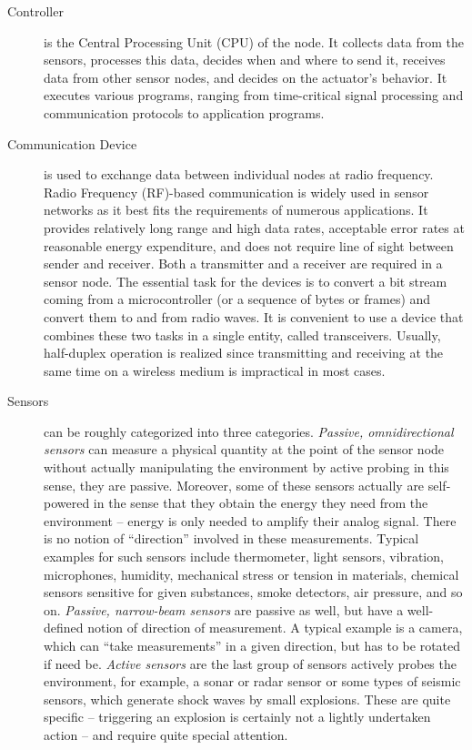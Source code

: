 	\begin{description}
	\item[Controller] is the Central Processing Unit (CPU) of the node.
		It collects data from the sensors, processes this data, decides when and where to send it, receives data from other sensor nodes, and decides on the actuator’s behavior.
		It executes various programs, ranging from time-critical signal processing and communication protocols to application programs.
	
	\item[Communication Device] is used to exchange data between individual nodes at radio frequency.
		Radio Frequency (RF)-based communication is widely used in sensor networks as it best fits the requirements of numerous applications.
		It provides relatively long range and high data rates, acceptable error rates at reasonable energy expenditure, and does not require line of sight between sender and receiver.
		Both a transmitter and a receiver are required in a sensor node. 
		The essential task for the devices is to convert a bit stream coming from a microcontroller (or a sequence of bytes or frames) and convert them to and from radio waves. 
		It is convenient to use a device that combines these two tasks in a single entity, called transceivers. 
		Usually, half-duplex operation is realized since transmitting and receiving at the same time on a wireless medium is impractical in most cases.

	\item[Sensors] can be roughly categorized into three categories.
		\textit{Passive, omnidirectional sensors} can measure a physical quantity at the point of the sensor node without actually manipulating the environment by active probing in this sense, they are passive. 
		Moreover, some of these sensors actually are self-powered in the sense that they obtain the energy they need from the environment – energy is only needed to amplify their analog signal. 
		There is no notion of ``direction'' involved in these measurements.
		Typical examples for such sensors include thermometer, light sensors, vibration, microphones, humidity, mechanical stress or tension in materials, chemical sensors sensitive for given substances, smoke detectors, air pressure, and so on.
		\textit{Passive, narrow-beam sensors} are passive as well, but have a well-defined notion of direction of measurement. 
		A typical example is a camera, which can ``take measurements'' in a given direction, but has to be rotated if need be.
		\textit{Active sensors} are the last group of sensors actively probes the environment, for example, a sonar or radar sensor or some types of seismic sensors, which generate shock waves by small explosions.
		These are quite specific – triggering an explosion is certainly not a lightly undertaken action – and require quite special attention.


\end{description}
